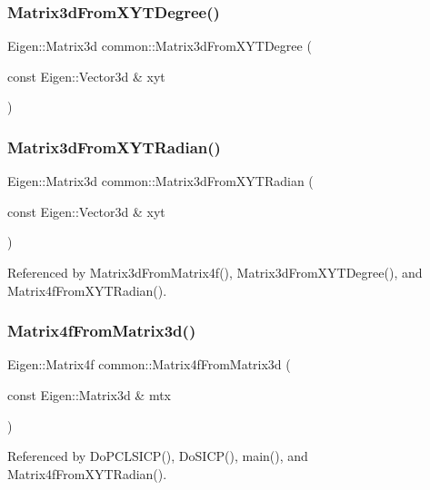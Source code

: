 \subsubsection{\texorpdfstring{Matrix3d\+From\+X\+Y\+T\+Degree()}{Matrix3dFromXYTDegree()}}
{\footnotesize\ttfamily Eigen\+::\+Matrix3d common\+::\+Matrix3d\+From\+X\+Y\+T\+Degree (\begin{DoxyParamCaption}\item[{const Eigen\+::\+Vector3d \&}]{xyt }\end{DoxyParamCaption})}

\mbox{\label{namespacecommon_a79c5532f7b71e03e4436194f78e637ce}} 
\subsubsection{\texorpdfstring{Matrix3d\+From\+X\+Y\+T\+Radian()}{Matrix3dFromXYTRadian()}}
{\footnotesize\ttfamily Eigen\+::\+Matrix3d common\+::\+Matrix3d\+From\+X\+Y\+T\+Radian (\begin{DoxyParamCaption}\item[{const Eigen\+::\+Vector3d \&}]{xyt }\end{DoxyParamCaption})}



Referenced by Matrix3d\+From\+Matrix4f(), Matrix3d\+From\+X\+Y\+T\+Degree(), and Matrix4f\+From\+X\+Y\+T\+Radian().

\mbox{\label{namespacecommon_a95c001ee532d4d5659496a2f3699e3d7}} 
\subsubsection{\texorpdfstring{Matrix4f\+From\+Matrix3d()}{Matrix4fFromMatrix3d()}}
{\footnotesize\ttfamily Eigen\+::\+Matrix4f common\+::\+Matrix4f\+From\+Matrix3d (\begin{DoxyParamCaption}\item[{const Eigen\+::\+Matrix3d \&}]{mtx }\end{DoxyParamCaption})}



Referenced by Do\+P\+C\+L\+S\+I\+C\+P(), Do\+S\+I\+C\+P(), main(), and Matrix4f\+From\+X\+Y\+T\+Radian().

